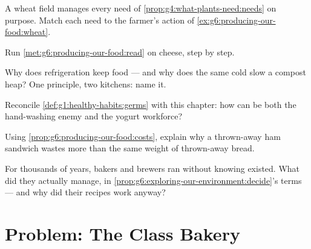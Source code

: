 \begin{exercise}[$\star\star$]\label{exo:g6:producing-our-food:7}
A wheat field manages every need of
\cref{prop:g4:what-plants-need:needs} on purpose. Match
each need to the farmer's action of
\cref{ex:g6:producing-our-food:wheat}.
\end{exercise}

\begin{exercise}[$\star\star$]\label{exo:g6:producing-our-food:8}
Run \cref{met:g6:producing-our-food:read} on cheese, step
by step.
\end{exercise}

\begin{exercise}[$\star\star$]\label{exo:g6:producing-our-food:9}
Why does refrigeration keep food --- and why does the same
cold slow a compost heap? One principle, two kitchens:
name it.
\end{exercise}

\begin{exercise}[$\star\star$]\label{exo:g6:producing-our-food:10}
Reconcile \cref{def:g1:healthy-habits:germs} with this
chapter: how can  be both the hand-washing enemy
and the yogurt workforce?
\end{exercise}

\begin{exercise}[$\star\star$]\label{exo:g6:producing-our-food:11}
Using \cref{prop:g6:producing-our-food:costs}, explain why
a thrown-away ham sandwich wastes more than the same
weight of thrown-away bread.
\end{exercise}

\begin{exercise}[$\star\star\star$]\label{exo:g6:producing-our-food:12}
For thousands of years, bakers and brewers ran
 without knowing  existed. What did
they actually manage, in
\cref{prop:g6:exploring-our-environment:decide}'s terms
--- and why did their recipes work anyway?
\end{exercise}

\section{Problem: The Class Bakery}

